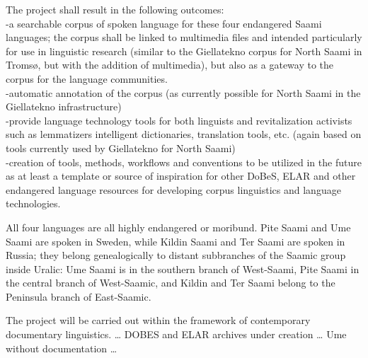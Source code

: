 \documentclass[a4paper,12pt]{article}
\begin{document}
The project shall result in the following outcomes:\\
-a searchable corpus of spoken language for these four endangered Saami languages; the corpus shall be linked to multimedia files and intended particularly for use in linguistic research (similar to the Giellatekno corpus for North Saami in Tromsø, but with the addition of multimedia), but also as a gateway to the corpus for the language communities.\\
-automatic annotation of the corpus (as currently possible for North Saami in the Giellatekno infrastructure)\\
-provide language technology tools for both linguists and revitalization activists such as lemmatizers %
intelligent dictionaries, translation tools, etc. (again based on tools currently used by Giellatekno for North Saami)\\
-creation of tools, methods, workflows and conventions to be utilized in the future as at least a template or source of inspiration for other DoBeS, ELAR and other endangered language resources for developing corpus linguistics and language technologies.


All four languages are all highly endangered or moribund. Pite Saami and Ume Saami are spoken in Sweden, while Kildin Saami and Ter Saami are spoken in Russia; they belong genealogically to distant subbranches of the Saamic group inside Uralic: Ume Saami is in the southern branch of West-Saami, Pite Saami in the central branch of West-Saamic, and Kildin and Ter Saami belong to the Peninsula branch of East-Saamic.

The project will be carried out within the framework of contemporary documentary linguistics. 
 … DOBES and ELAR archives under creation … Ume without documentation …
\end{document}
